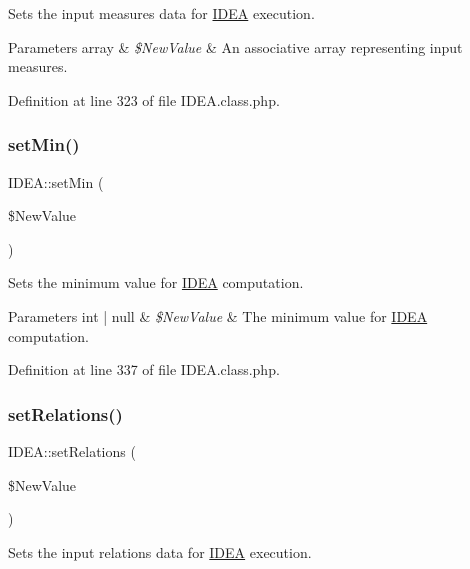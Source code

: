 Sets the input measures data for \hyperlink{class_i_d_e_a}{I\+D\+EA} execution.


\begin{DoxyParams}[1]{Parameters}
array & {\em \$\+New\+Value} & An associative array representing input measures. \\
\hline
\end{DoxyParams}


Definition at line 323 of file I\+D\+E\+A.\+class.\+php.

\mbox{\label{class_i_d_e_a_a7ada7c59e4920dd9fa811543c18804bc}} 
\subsubsection{\texorpdfstring{set\+Min()}{setMin()}}
{\footnotesize\ttfamily I\+D\+E\+A\+::set\+Min (\begin{DoxyParamCaption}\item[{}]{\$\+New\+Value }\end{DoxyParamCaption})}

Sets the minimum value for \hyperlink{class_i_d_e_a}{I\+D\+EA} computation.


\begin{DoxyParams}[1]{Parameters}
int | null & {\em \$\+New\+Value} & The minimum value for \hyperlink{class_i_d_e_a}{I\+D\+EA} computation. \\
\hline
\end{DoxyParams}


Definition at line 337 of file I\+D\+E\+A.\+class.\+php.

\mbox{\label{class_i_d_e_a_af72fb5120db8911ae3a6efb68d73a908}} 
\subsubsection{\texorpdfstring{set\+Relations()}{setRelations()}}
{\footnotesize\ttfamily I\+D\+E\+A\+::set\+Relations (\begin{DoxyParamCaption}\item[{}]{\$\+New\+Value }\end{DoxyParamCaption})}

Sets the input relations data for \hyperlink{class_i_d_e_a}{I\+D\+EA} execution.


